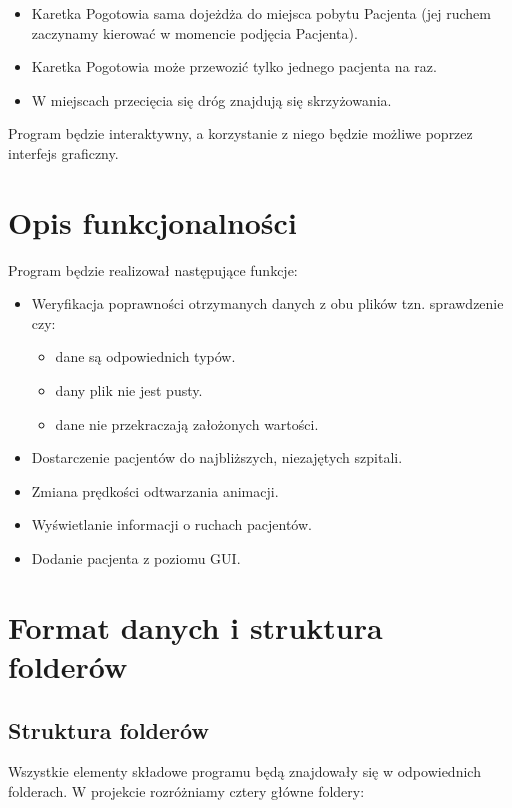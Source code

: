 \documentclass{article}
\begin{document}
    \begin{itemize}
        \item Karetka Pogotowia sama dojeżdża do miejsca pobytu Pacjenta (jej ruchem zaczynamy kierować w momencie podjęcia Pacjenta).
        \item Karetka Pogotowia może przewozić tylko jednego pacjenta na raz.
        \item W miejscach przecięcia się dróg znajdują się skrzyżowania.
        \end{itemize}
    Program będzie interaktywny, a korzystanie z niego będzie możliwe poprzez interfejs graficzny.

\section{Opis funkcjonalności}
    Program będzie realizował następujące funkcje:
    \begin{itemize}
        \item Weryfikacja poprawności otrzymanych danych z obu plików tzn. sprawdzenie czy:
            \begin{itemize}
            \item dane są odpowiednich typów.
            \item dany plik nie jest pusty.
            \item dane nie przekraczają założonych wartości.
            \end{itemize}
        \item Dostarczenie pacjentów do najbliższych, niezajętych szpitali.
        \item Zmiana prędkości odtwarzania animacji.
        \item Wyświetlanie informacji o ruchach pacjentów.
        \item Dodanie pacjenta z poziomu GUI.
    \end{itemize}

\section{Format danych i struktura folderów}

    \subsection{Struktura folderów}
        Wszystkie elementy składowe programu będą znajdowały się w odpowiednich folderach. W projekcie rozróżniamy cztery główne foldery:
\end{document}
